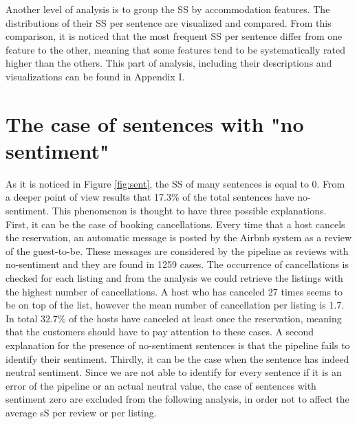 Another level of analysis is to group the SS by accommodation features. The distributions of their SS per sentence are visualized and compared. From this comparison, it is noticed that the most frequent SS per sentence differ from one feature to the other, meaning that some features tend to be systematically rated higher than the others. This part of analysis, including their descriptions and visualizations can be found in Appendix I.
%
%
%
\section{The case of sentences with "no sentiment"}
%
%
As it is noticed in Figure \ref{fig:sent}, the SS of many sentences is equal to 0. From a deeper point of view results that 17.3\% of the total sentences have no-sentiment. This phenomenon is thought to have three possible explanations. First, it can be the case of booking cancellations. Every time that a host cancels the reservation, an automatic message is posted by the Airbnb system as a review of the guest-to-be. These messages are considered by the pipeline as reviews with no-sentiment and they are found in 1259 cases. The occurrence of cancellations is checked for each listing and from the analysis we could retrieve the listings with the highest number of cancellations. A host who has canceled 27 times seems to be on top of the list, however the mean number of cancellation per listing is 1.7. In total 32.7\% of the hosts have canceled at least once the reservation, meaning that the customers should  have to pay attention to these cases. A second explanation for the presence of no-sentiment sentences is that the pipeline fails to identify their sentiment. Thirdly,  it can be the case when the sentence has indeed neutral sentiment. Since we are not able to identify for every sentence if it is an error of the pipeline or an actual neutral value, the case of sentences with sentiment zero are excluded from the following analysis, in order not to affect the average sS per review or per listing.

